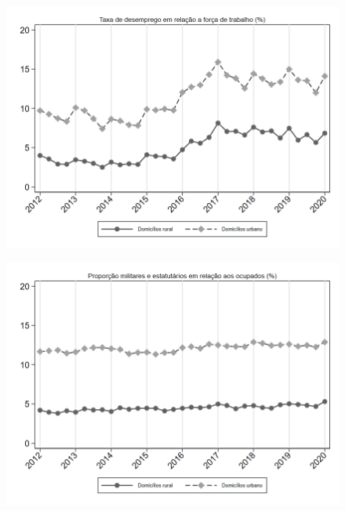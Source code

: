 \begin{frame}[label=_composicao_demografica_rural_urbano_taxa_de_desemprego]{}
\textit{\hyperlink{_composicao_demografica_rural_urbano}{}}
\begin{figure}
  \centering
  \includegraphics[width=1.0\linewidth]{../../analysis/output/composicao_demografica/area_geografica/_composicao_demografica_rural_urbano_taxa_de_desemprego.png}
  \caption{}
  \label{fig:_composicao_demografica_rural_urbano_taxa_de_desemprego}
\end{figure}
\end{frame}

\begin{frame}[label=_composicao_demografica_rural_urbano_prop_militar]{}
\textit{\hyperlink{_composicao_demografica_rural_urbano}{}}
\begin{figure}
  \centering
  \includegraphics[width=1.0\linewidth]{../../analysis/output/composicao_demografica/area_geografica/_composicao_demografica_rural_urbano_prop_militar.png}
  \caption{}
  \label{fig:_composicao_demografica_rural_urbano_prop_militar}
\end{figure}
\end{frame}


